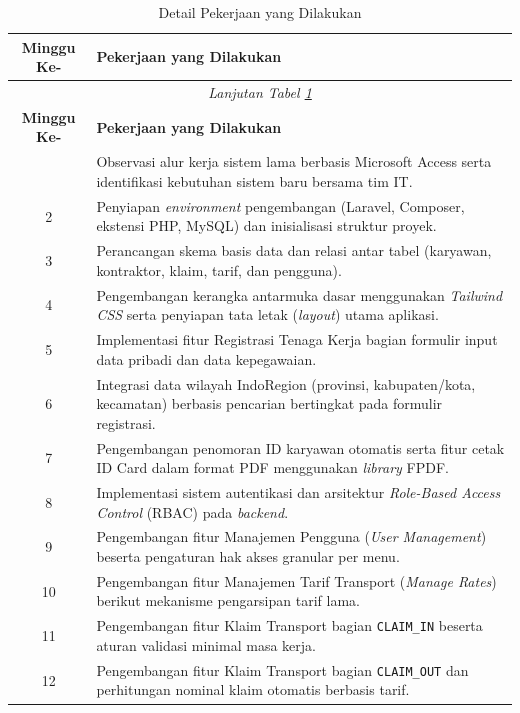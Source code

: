 \begin{longtable}{|c | p{}| }
	\caption{Detail Pekerjaan yang Dilakukan}
	\label{tbl_uraian} \\
	\hline
	\textbf{Minggu Ke-} & \textbf{Pekerjaan yang Dilakukan} \\
	\hline
	\endfirsthead
	\multicolumn{2}{c}{\textit{Lanjutan Tabel \ref{tbl_uraian}}} \\
	\hline
	\textbf{Minggu Ke-} & \textbf{Pekerjaan yang Dilakukan} \\
	\hline
	\endhead
	\hline
	\endfoot
	\hline
	\endlastfoot
	1 & Observasi alur kerja sistem lama berbasis Microsoft Access serta identifikasi kebutuhan sistem baru bersama tim IT. \\
	\hline
	2 & Penyiapan \textit{environment} pengembangan (Laravel, Composer, ekstensi PHP, MySQL) dan inisialisasi struktur proyek. \\
	\hline
	3 & Perancangan skema basis data dan relasi antar tabel (karyawan, kontraktor, klaim, tarif, dan pengguna). \\
	\hline
	4 & Pengembangan kerangka antarmuka dasar menggunakan \textit{Tailwind CSS} serta penyiapan tata letak (\textit{layout}) utama aplikasi. \\
	\hline
	5 & Implementasi fitur Registrasi Tenaga Kerja bagian formulir input data pribadi dan data kepegawaian. \\
	\hline
	6 & Integrasi data wilayah IndoRegion (provinsi, kabupaten/kota, kecamatan) berbasis pencarian bertingkat pada formulir registrasi. \\
	\hline
	7 & Pengembangan penomoran ID karyawan otomatis serta fitur cetak ID Card dalam format PDF menggunakan \textit{library} FPDF. \\
	\hline
	8 & Implementasi sistem autentikasi dan arsitektur \textit{Role-Based Access Control} (RBAC) pada \textit{backend}. \\
	\hline
	9 & Pengembangan fitur Manajemen Pengguna (\textit{User Management}) beserta pengaturan hak akses granular per menu. \\
	\hline
	10 & Pengembangan fitur Manajemen Tarif Transport (\textit{Manage Rates}) berikut mekanisme pengarsipan tarif lama. \\
	\hline
	11 & Pengembangan fitur Klaim Transport bagian \texttt{CLAIM\_IN} beserta aturan validasi minimal masa kerja. \\
	\hline
	12 & Pengembangan fitur Klaim Transport bagian \texttt{CLAIM\_OUT} dan perhitungan nominal klaim otomatis berbasis tarif. \\

\end{longtable}
